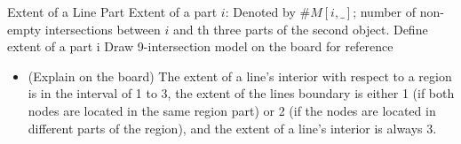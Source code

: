 	\begin{frame}{Extent of a Line Part}
		Extent of a part $i$: Denoted by $ \#M[i, \_]$; number of non-empty intersections between $i$ and th three parts of the second object.
		Define extent of a part i Draw 9-intersection model on the board for reference
		
		\begin{itemize}
			\item (Explain on the board) The extent of a line's interior with respect to a region is in the interval of 1 to 3, the extent of the lines boundary is either 1 (if both nodes are located in the same region part) or 2 (if the nodes are located in different parts of the region), and the extent of a line's interior is always 3.
		\end{itemize}
	\end{frame}
	
